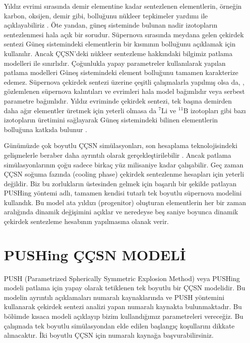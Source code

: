 Yıldız evrimi sırasında demir elementine kadar sentezlenen elementlerin, örneğin karbon, oksijen, demir gibi, bolluğunu nükleer tepkimeler yardımı ile açıklayabiliriz \cite{Burbidge:1957vc}. Öte yandan, güneş sisteminde bulunan nadir izotopların sentezlenmesi hala açık bir sorudur. Süpernova sırasında meydana gelen çekirdek sentezi Güneş sistemindeki elementlerin bir kısmının bolluğunu açıklamak için kullanılır. Ancak ÇÇSN'deki nükleer sentezleme hakkındaki bilgimiz patlama modelleri ile sınırlıdır. Çoğunlukla yapay parametreler kullanılarak yapılan patlama modelleri Güneş sistemindeki element bolluğunu tamamen karakterize edemez. Süpernova çekirdek sentezi üzerine çeşitli çalışmalarla yapılmış olsa da, \cite{1954ApJS....1..121H, 1995ApJS..101..181W, 1996ApJ...460..408T}, gözlemlenen süpernova kalıntıları ve evrimleri hala model bağımlıdır veya serbest parametre bağımlıdır. Yıldız evriminde çekirdek sentezi, tek başına demirden daha ağır elementler üretmek için yeterli olmasa da $ ^{7} $Li ve $ ^{11} $B izotopları gibi bazı izotopların üretimini sağlayarak Güneş sistemindeki bilinen elementlerin bolluğuna katkıda bulunur \cite {Sieverding:2018rdt}.

Günümüzde çok boyutlu ÇÇSN simülasyonları, son hesaplama teknolojisindeki gelişmelerle beraber daha ayrıntılı olarak gerçekleştirilebilir \cite{Janka:2017vcp}. Ancak patlama simülasyonlarının çoğu sadece birkaç yüz milisaniye kadar çalışabilir. Geç zaman ÇÇSN soğuma fazında (cooling phase) çekirdek sentezlenme hesapları için yeterli değildir. Biz bu zorlukların üstesinden gelmek için başarılı bir şekilde patlayan PUSHing yöntemi \cite{2015ApJ...806..275P} adlı, tamamen kendisi tutarlı tek boyutlu süpernova modelini kullandık. Bu model ata yıldızı (progenitor) oluşturan elementlerin her bir zaman aralığında dinamik değişimini açıklar ve neredeyse beş saniye boyunca dinamik çekirdek sentezleme hesabının yapılmasına olanak verir.

\section{PUSHing ÇÇSN MODELİ}\label{sec:PUSHing}
\paragraph{}
PUSH (Parametrized Spherically Symmetric Explosion Method) veya PUSHing modeli patlama için yapay olarak tetiklenen tek boyutlu bir ÇÇSN modelidir. Bu modelin ayrıntılı açıklamaları \cite{2015ApJ...806..275P,2019ApJ...870....1E} numaralı kaynaklarında ve PUSH yöntemini kullanarak çekirdek sentezi analizi yapan \cite{Curtis:2018vkh} numaralı kaynakta bulunmaktadır. Bu bölümde kısaca modeli açıklayıp bizim kullandığımız parametreleri vereceğiz. Bu çalışmada tek boyutlu simülasyondan elde edilen başlangıç koşullarını dikkate alınacaktır. İki boyutlu ÇÇSN için \cite{2018JPhCS.940a2054S} numaralı kaynağa başvurabilirsiniz.

